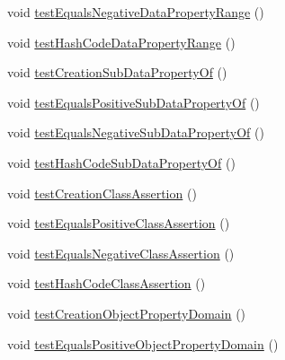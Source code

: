 \begin{DoxyCompactItemize}
\item 
void \hyperlink{classorg_1_1semanticweb_1_1owlapi_1_1datafactory_1_1_o_w_l_data_factory_test_case_abbc237366c50221185aab8d60992fc38}{test\-Equals\-Negative\-Data\-Property\-Range} ()
\item 
void \hyperlink{classorg_1_1semanticweb_1_1owlapi_1_1datafactory_1_1_o_w_l_data_factory_test_case_a85155f076add9d0035219f62aea0aae2}{test\-Hash\-Code\-Data\-Property\-Range} ()
\item 
void \hyperlink{classorg_1_1semanticweb_1_1owlapi_1_1datafactory_1_1_o_w_l_data_factory_test_case_ad1b44b2bfec8a8a6cca30b974973eb3d}{test\-Creation\-Sub\-Data\-Property\-Of} ()
\item 
void \hyperlink{classorg_1_1semanticweb_1_1owlapi_1_1datafactory_1_1_o_w_l_data_factory_test_case_adf226ccad7320ef4d63e68723662f20c}{test\-Equals\-Positive\-Sub\-Data\-Property\-Of} ()
\item 
void \hyperlink{classorg_1_1semanticweb_1_1owlapi_1_1datafactory_1_1_o_w_l_data_factory_test_case_af197d55b392965d1c3664791f5d940ad}{test\-Equals\-Negative\-Sub\-Data\-Property\-Of} ()
\item 
void \hyperlink{classorg_1_1semanticweb_1_1owlapi_1_1datafactory_1_1_o_w_l_data_factory_test_case_aabd9f846b34da2ee2eb488f0af86ae42}{test\-Hash\-Code\-Sub\-Data\-Property\-Of} ()
\item 
void \hyperlink{classorg_1_1semanticweb_1_1owlapi_1_1datafactory_1_1_o_w_l_data_factory_test_case_aeddf09c5125716615337ec1394c6d1f0}{test\-Creation\-Class\-Assertion} ()
\item 
void \hyperlink{classorg_1_1semanticweb_1_1owlapi_1_1datafactory_1_1_o_w_l_data_factory_test_case_a29e23428fcff8f50554ccfef3289fd9b}{test\-Equals\-Positive\-Class\-Assertion} ()
\item 
void \hyperlink{classorg_1_1semanticweb_1_1owlapi_1_1datafactory_1_1_o_w_l_data_factory_test_case_a854f3f73bd343551ee5d8baa8c36af2d}{test\-Equals\-Negative\-Class\-Assertion} ()
\item 
void \hyperlink{classorg_1_1semanticweb_1_1owlapi_1_1datafactory_1_1_o_w_l_data_factory_test_case_a52acc259b4be47778cdb01cb73536acb}{test\-Hash\-Code\-Class\-Assertion} ()
\item 
void \hyperlink{classorg_1_1semanticweb_1_1owlapi_1_1datafactory_1_1_o_w_l_data_factory_test_case_a5758cbb385d2fced42568503f16f2e17}{test\-Creation\-Object\-Property\-Domain} ()
\item 
void \hyperlink{classorg_1_1semanticweb_1_1owlapi_1_1datafactory_1_1_o_w_l_data_factory_test_case_a1d4840d96a2a10c2ee0566d459b6b20e}{test\-Equals\-Positive\-Object\-Property\-Domain} ()

\end{DoxyCompactItemize}
